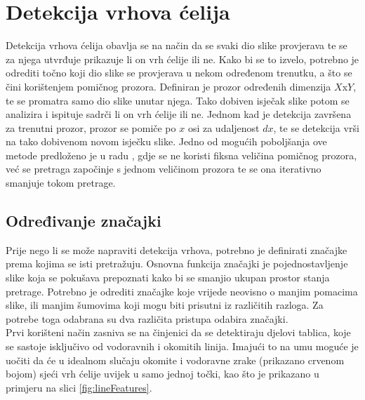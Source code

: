 \documentclass[times, utf8, zavrsni, numeric]{fer}
\begin{document}
\section{Detekcija vrhova ćelija}
Detekcija vrhova ćelija obavlja se na način da se svaki dio slike provjerava te se za njega utvrđuje prikazuje li on vrh ćelije ili ne. 
Kako bi se to izvelo, potrebno je odrediti točno koji dio slike se provjerava u nekom određenom trenutku, a što se čini korištenjem pomičnog prozora. 
Definiran je prozor određenih dimenzija $X$x$Y$, te se promatra samo dio slike unutar njega. 
Tako dobiven isječak slike potom se analizira i ispituje sadrči li on vrh ćelije ili ne.
Jednom kad je detekcija završena za trenutni prozor, prozor se pomiče po $x$ osi za udaljenost $dx$, te se detekcija vrši na tako dobivenom novom isječku slike.
Jedno od mogućih poboljšanja ove metode predloženo je u radu \cite{ViolaJones}, gdje se ne koristi fiksna veličina pomičnog prozora, već se pretraga započinje s jednom veličinom prozora te se ona iterativno smanjuje tokom pretrage.


\subsection{Određivanje značajki}
Prije nego li se može napraviti detekcija vrhova, potrebno je definirati značajke prema kojima se isti pretražuju.
Osnovna funkcija značajki je pojednostavljenje slike koja se pokušava prepoznati kako bi se smanjio ukupan prostor stanja pretrage.
Potrebno je odrediti značajke koje vrijede neovisno o manjim pomacima slike, ili manjim šumovima koji mogu biti prisutni iz različitih razloga.
Za potrebe toga odabrana su dva različita pristupa odabira značajki.\\

Prvi korišteni način zasniva se na činjenici da se detektiraju djelovi tablica, koje se sastoje isključivo od vodoravnih i okomitih linija.
Imajući to na umu moguće je uočiti da će u idealnom slučaju okomite i vodoravne zrake (prikazano crvenom bojom) sjeći vrh ćelije uvijek u samo jednoj točki, kao što je prikazano u primjeru na slici \ref{fig:lineFeatures}.
\end{document}
